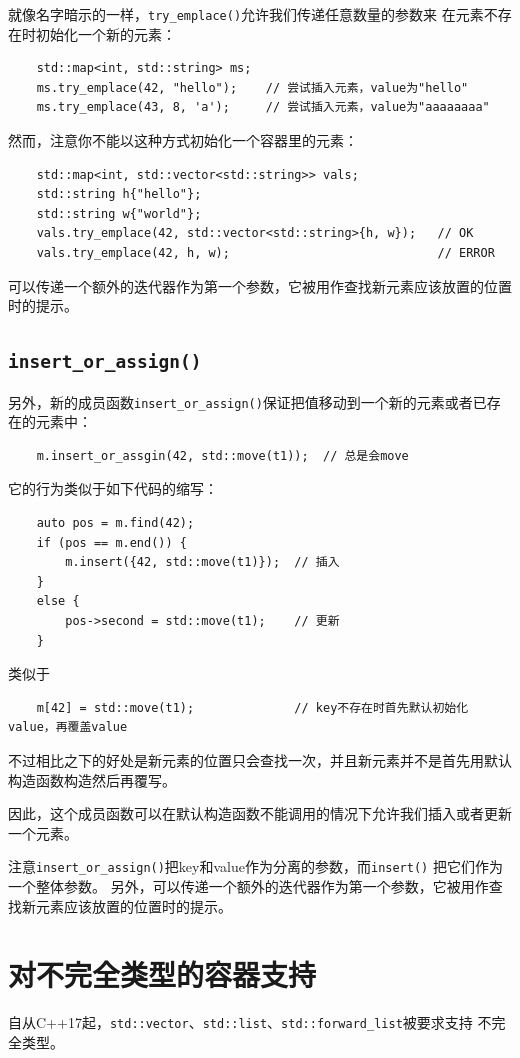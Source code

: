 就像名字暗示的一样，\texttt{try\_emplace()}允许我们传递任意数量的参数来
在元素不存在时初始化一个新的元素：
\begin{lstlisting}
    std::map<int, std::string> ms;
    ms.try_emplace(42, "hello");    // 尝试插入元素，value为"hello"
    ms.try_emplace(43, 8, 'a');     // 尝试插入元素，value为"aaaaaaaa"
\end{lstlisting}
然而，注意你不能以这种方式初始化一个容器里的元素：
\begin{lstlisting}
    std::map<int, std::vector<std::string>> vals;
    std::string h{"hello"};
    std::string w{"world"};
    vals.try_emplace(42, std::vector<std::string>{h, w});   // OK
    vals.try_emplace(42, h, w);                             // ERROR
\end{lstlisting}
可以传递一个额外的迭代器作为第一个参数，它被用作查找新元素应该放置的位置时的提示。

\subsection{\texttt{insert\_or\_assign()}}
另外，新的成员函数\texttt{insert\_or\_assign()}保证把值移动到一个新的元素或者已存在的元素中：
\begin{lstlisting}
    m.insert_or_assgin(42, std::move(t1));  // 总是会move
\end{lstlisting}
它的行为类似于如下代码的缩写：
\begin{lstlisting}
    auto pos = m.find(42);
    if (pos == m.end()) {
        m.insert({42, std::move(t1)});  // 插入
    }
    else {
        pos->second = std::move(t1);    // 更新
    }
\end{lstlisting}
类似于
\begin{lstlisting}
    m[42] = std::move(t1);              // key不存在时首先默认初始化value，再覆盖value
\end{lstlisting}
不过相比之下的好处是新元素的位置只会查找一次，并且新元素并不是首先用默认构造函数构造然后再覆写。

因此，这个成员函数可以在默认构造函数不能调用的情况下允许我们插入或者更新一个元素。

注意\texttt{insert\_or\_assign()}把key和value作为分离的参数，而\texttt{insert()}
把它们作为一个整体参数。
另外，可以传递一个额外的迭代器作为第一个参数，它被用作查找新元素应该放置的位置时的提示。


\section{对不完全类型的容器支持}
自从C++17起，\texttt{std::vector}、\texttt{std::list}、\texttt{std::forward\_list}被要求支持
不完全类型。

